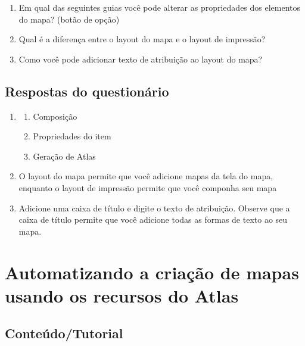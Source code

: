 \documentclass[
  portuguese,
]{krantz}
\providecommand{\tightlist}{%
  \setlength{\itemsep}{0pt}\setlength{\parskip}{0pt}}
\begin{document}
\begin{enumerate}
\def\labelenumi{\arabic{enumi}.}
\tightlist
\item
  Em qual das seguintes guias você pode alterar as propriedades dos elementos do mapa? (botão de opção)
\item
  Qual é a diferença entre o layout do mapa e o layout de impressão?
\item
  Como você pode adicionar texto de atribuição ao layout do mapa?
\end{enumerate}

\hypertarget{respostas-do-questionuxe1rio-2}{%
\subsection{\texorpdfstring{\textbf{Respostas do questionário }}{Respostas do questionário }}\label{respostas-do-questionuxe1rio-2}}

\begin{enumerate}
\def\labelenumi{\arabic{enumi}.}
\item
  \begin{enumerate}
  \def\labelenumii{\alph{enumii}.}
  \tightlist
  \item
    Composição
  \item
    Propriedades do item
  \item
    Geração de Atlas
  \end{enumerate}
\item
  O layout do mapa permite que você adicione mapas da tela do mapa, enquanto o layout de impressão permite que você componha seu mapa
\item
  Adicione uma caixa de título e digite o texto de atribuição. Observe que a caixa de título permite que você adicione todas as formas de texto ao seu mapa.
\end{enumerate}

\hypertarget{automatizando-a-criauxe7uxe3o-de-mapas-usando-os-recursos-do-atlas}{%
\section{Automatizando a criação de mapas usando os recursos do Atlas}\label{automatizando-a-criauxe7uxe3o-de-mapas-usando-os-recursos-do-atlas}}

\hypertarget{conteuxfadotutorial-1}{%
\subsection{\texorpdfstring{\textbf{Conteúdo/Tutorial}}{Conteúdo/Tutorial}}\label{conteuxfadotutorial-1}}
\end{document}
